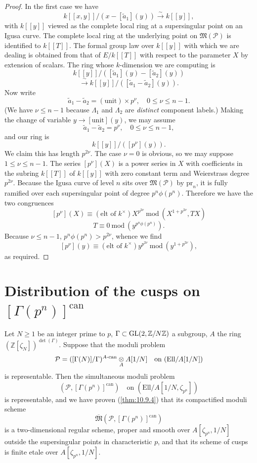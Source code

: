 \begin{proof}
In the first case we have
\[
k[[x,y]]/(x - [\tilde a_1](y)) \xrightarrow{\ \sim\ } k[[y]] ,
\]
with $k[[y]]$ viewed as the complete local ring at a supersingular point on an Igusa curve. The complete local ring at the underlying point on $\mathfrak{M}(\mathcal{P})$ is identified to $k[[T]]$. The formal group law over $k[[y]]$ with which we are dealing is obtained from that of $E/k[[T]]$ with respect to the parameter $X$ by extension of scalars. The ring whose $k$-dimension we are computing is
\[
k[[y]]/([\tilde a_1](y) - [\tilde a_2](y))
\]
\[
\xrightarrow{\ \sim\ } k[[y]]/([\tilde a_1 - \tilde a_2](y)) .
\]
Now write
\[
\tilde a_1 - \tilde a_2 = (\text{unit}) \times p^\nu , \quad 0 \le \nu \le n-1 .
\]
(We have $\nu \le n-1$ because $\Lambda_1$ and $\Lambda_2$ are \emph{distinct} component labels.) Making the change of variable $y \to [\mathrm{unit}](y)$, we may assume
\[
\tilde a_1 - \tilde a_2 = p^\nu , \quad 0 \le \nu \le n-1 ,
\]
and our ring is
\[
k[[y]]/([p^\nu](y)) .
\]
We claim this has length $p^{2\nu}$. The case $\nu = 0$ is obvious, so we may suppose $1 \le \nu \le n-1$. The series $[p^\nu](X)$ is a power series in $X$ with coefficients in the subring $k[[T]]$ of $k[[y]]$ with zero constant term and Weierstrass degree $p^{2\nu}$. Because the Igusa curve of level $n$ sits over $\mathfrak{M}(\mathcal{P})$ by $\mathrm{pr}_n$, it is fully ramified over each supersingular point of degree $p^n\phi(p^n)$. Therefore we have the two congruences
\[
[p^\nu](X) \equiv (\text{elt of } k^\times) X^{p^{2\nu}} \ \mathrm{mod}\ (X^{1+p^{2\nu}}, TX)
\]
\[
T \equiv 0 \ \mathrm{mod}\ (y^{p^n\phi(p^n)}) .
\]
Because $\nu \le n-1$, $p^n\phi(p^n) > p^{2\nu}$, whence we find
\[
[p^\nu](y) \equiv (\text{elt of } k^\times) y^{p^{2\nu}} \ \mathrm{mod}\ (y^{1+p^{2\nu}}) ,
\]
as required.
\end{proof}

\section[Distribution of the cusps on {$[\Gamma(p^n)]^{\mathrm{can}}$}]{Distribution of the cusps on \texorpdfstring{$[\Gamma(p^n)]^{\mathrm{can}}$}{[Gamma(p^n)]^can}}
\label{sec:13.9}

\kmitem\label{item:13.9.1}Let $N \ge 1$ be an integer prime to $p$, $\Gamma \subset \operatorname{GL}(2,\mathbb{Z}/N\mathbb{Z})$ a subgroup, $A$ the ring $(\mathbb{Z}[\zeta_N])^{\det(\Gamma)}$. Suppose that the moduli problem
\[
\mathcal{P} = ([\Gamma(N)]/\Gamma)^{A\text{-can}} \underset{A}{\otimes} A[1/N] \quad \text{on } (\mathrm{Ell}/A[1/N])
\]
is representable. Then the simultaneous moduli problem
\[
(\mathcal{P}, [\Gamma(p^n)]^{\mathrm{can}}) \quad \text{on } (\mathrm{Ell}/A[1/N, \zeta_{p^n}])
\]
is representable, and we have proven (\ref{thm:10.9.4}) that its compactified moduli scheme
\[
\overline{\mathfrak{M}}(\mathcal{P}, [\Gamma(p^n)]^{\mathrm{can}})
\]
is a two-dimensional regular scheme, proper and smooth over $A[\zeta_{p^n}, 1/N]$ outside the supersingular points in characteristic $p$, and that its scheme of cusps is finite etale over $A[\zeta_{p^n}, 1/N]$.

